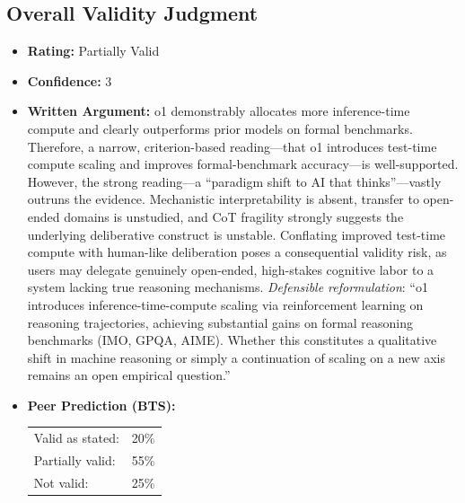 \subsection{Overall Validity Judgment}
\begin{itemize}
    \item \textbf{Rating:} Partially Valid
    \item \textbf{Confidence:} 3
    \item \textbf{Written Argument:} o1 demonstrably allocates more inference-time compute and clearly outperforms prior models on formal benchmarks. Therefore, a narrow, criterion-based reading---that o1 introduces test-time compute scaling and improves formal-benchmark accuracy---is well-supported. However, the strong reading---a ``paradigm shift to AI that thinks''---vastly outruns the evidence. Mechanistic interpretability is absent, transfer to open-ended domains is unstudied, and CoT fragility \citep{mirzadeh2025gsm} strongly suggests the underlying deliberative construct is unstable. Conflating improved test-time compute with human-like deliberation poses a consequential validity risk, as users may delegate genuinely open-ended, high-stakes cognitive labor to a system lacking true reasoning mechanisms. \emph{Defensible reformulation}: ``o1 introduces inference-time-compute scaling via reinforcement learning on reasoning trajectories, achieving substantial gains on formal reasoning benchmarks (IMO, GPQA, AIME). Whether this constitutes a qualitative shift in machine reasoning or simply a continuation of scaling on a new axis remains an open empirical question.''
    \item \textbf{Peer Prediction (BTS):}

    \begin{tabular}{ll}
        Valid as stated: & 20\% \\
        Partially valid: & 55\% \\
        Not valid: & 25\% \\
        \end{tabular}\\[4pt]
\end{itemize}
